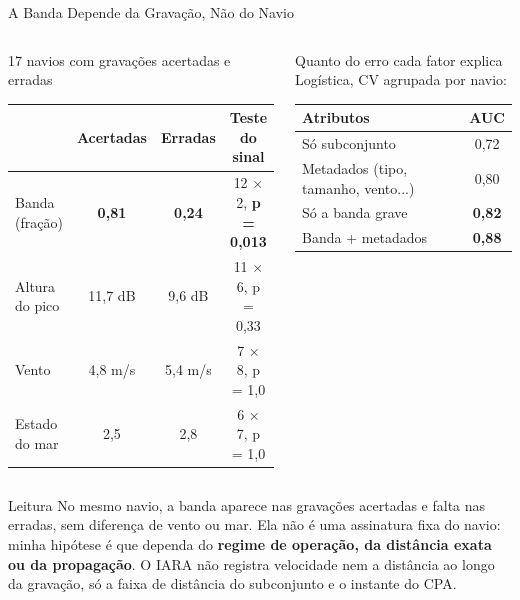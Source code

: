 \documentclass[aspectratio=169]{beamer}
\begin{document}
\begin{frame}{A Banda Depende da Gravação, Não do Navio}
    \footnotesize
    \begin{columns}[t]
        \begin{block}{\small 17 navios com gravações acertadas e erradas}\setlength{\tabcolsep}{3pt}
            \scriptsize
            \centering
            \begin{tabular}{lccc}
            \toprule
             & Acertadas & Erradas & Teste do sinal \\
            \midrule
            Banda (fração) & \textbf{0,81} & \textbf{0,24} & 12 $\times$ 2, \textbf{p = 0,013} \\
            Altura do pico & 11,7 dB & 9,6 dB & 11 $\times$ 6, p = 0,33 \\
            Vento & 4,8 m/s & 5,4 m/s & 7 $\times$ 8, p = 1,0 \\
            Estado do mar & 2,5 & 2,8 & 6 $\times$ 7, p = 1,0 \\
            \bottomrule
            \end{tabular}
        \end{block}
        \begin{block}{\small Quanto do erro cada fator explica}
            \scriptsize
            \centering
            Logística, CV agrupada por navio:

            \vspace{0.05cm}
            \begin{tabular}{lc}
            \toprule
            Atributos & AUC \\
            \midrule
            Só subconjunto & 0,72 \\
            Metadados (tipo, tamanho, vento...) & 0,80 \\
            Só a banda grave & \textbf{0,82} \\
            Banda + metadados & \textbf{0,88} \\
            \bottomrule
            \end{tabular}
        \end{block}
    \end{columns}
    \vspace{0.1cm}
    \begin{alertblock}{Leitura}
        \scriptsize
        No mesmo navio, a banda aparece nas gravações acertadas e falta nas erradas, sem diferença de vento ou mar. Ela não é uma assinatura fixa do navio: minha hipótese é que dependa do \textbf{regime de operação, da distância exata ou da propagação}. O IARA não registra velocidade nem a distância ao longo da gravação, só a faixa de distância do subconjunto e o instante do CPA.
    \end{alertblock}
\end{frame}
\end{document}
